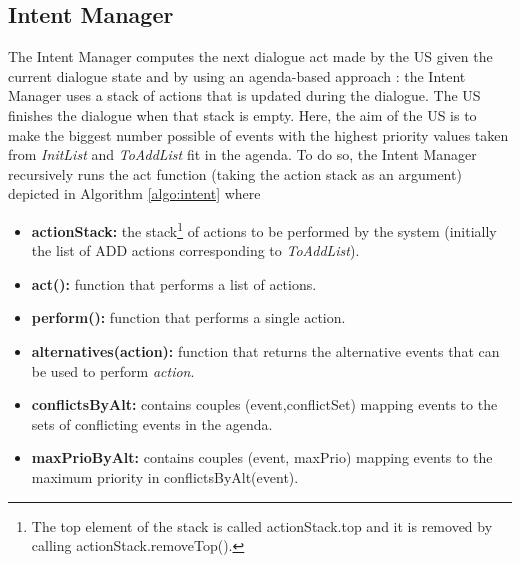     \subsection{Intent Manager}
    \label{subsec:intentmanager}

        The Intent Manager computes the next dialogue act made by the US given the current dialogue state and by using an agenda-based approach \cite{Wei1999,Schatzmann2007}: the Intent Manager uses a stack of actions that is updated during the dialogue. The US finishes the dialogue when that stack is empty. Here, the aim of the US is to make the biggest number possible of events with the highest priority values taken from \textit{InitList} and \textit{ToAddList} fit in the agenda. To do so, the Intent Manager recursively runs the act function (taking the action stack as an argument) depicted in Algorithm \ref{algo:intent} where
        
        
        \begin{itemize}
          \item \textbf{actionStack:} the stack\footnote{The top element of the stack is called actionStack.top and it is removed by calling actionStack.removeTop().} of actions to be performed by the system (initially the list of ADD actions corresponding to \textit{ToAddList}).
          \item \textbf{act():} function that performs a list of actions.
          \item \textbf{perform():} function that performs a single action.
          \item \textbf{alternatives(action):} function that returns the alternative events that can be used to perform \textit{action}.
          \item \textbf{conflictsByAlt:} contains couples (event,conflictSet) mapping events to the sets of conflicting events in the agenda.
          \item \textbf{maxPrioByAlt:} contains couples (event, maxPrio) mapping events to the maximum priority in conflictsByAlt(event).
        \end{itemize}
			
